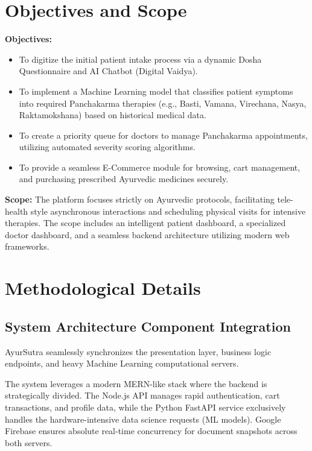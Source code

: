 \documentclass[10pt]{article}
\begin{document}
{\section{Objectives and Scope}
\textbf{Objectives:}
\begin{itemize}
    \item To digitize the initial patient intake process via a dynamic Dosha Questionnaire and AI Chatbot (Digital Vaidya).
    \item To implement a Machine Learning model that classifies patient symptoms into required Panchakarma therapies (e.g., Basti, Vamana, Virechana, Nasya, Raktamokshana) based on historical medical data.
    \item To create a priority queue for doctors to manage Panchakarma appointments, utilizing automated severity scoring algorithms.
    \item To provide a seamless E-Commerce module for browsing, cart management, and purchasing prescribed Ayurvedic medicines securely.
\end{itemize}

\textbf{Scope:}
The platform focuses strictly on Ayurvedic protocols, facilitating tele-health style asynchronous interactions and scheduling physical visits for intensive therapies. The scope includes an intelligent patient dashboard, a specialized doctor dashboard, and a seamless backend architecture utilizing modern web frameworks. 

\newpage
\section{Methodological Details}

\subsection{System Architecture Component Integration}
AyurSutra seamlessly synchronizes the presentation layer, business logic endpoints, and heavy Machine Learning computational servers. 

The system leverages a modern MERN-like stack where the backend is strategically divided. The Node.js API manages rapid authentication, cart transactions, and profile data, while the Python FastAPI service exclusively handles the hardware-intensive data science requests (ML models). Google Firebase ensures absolute real-time concurrency for document snapshots across both servers.

\begin{figure}[H]
    \centering
\end{figure}}
\end{document}
